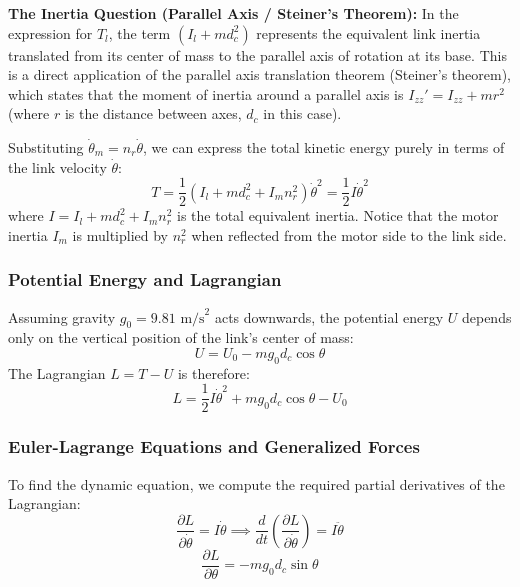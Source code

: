 \documentclass[11pt,a4paper]{article}
\begin{document}
\noindent \textbf{The Inertia Question (Parallel Axis / Steiner's Theorem):} 
In the expression for $T_l$, the term $(I_l + m d_c^2)$ represents the equivalent link inertia translated from its center of mass to the parallel axis of rotation at its base. This is a direct application of the parallel axis translation theorem (Steiner's theorem), which states that the moment of inertia around a parallel axis is $I_{zz}' = I_{zz} + m r^2$ (where $r$ is the distance between axes, $d_c$ in this case). 

Substituting $\dot{\theta}_m = n_r \dot{\theta}$, we can express the total kinetic energy purely in terms of the link velocity $\dot{\theta}$:
\begin{equation}
T = \frac{1}{2} (I_l + m d_c^2 + I_m n_r^2) \dot{\theta}^2 = \frac{1}{2} I \dot{\theta}^2
\end{equation}
where $I = I_l + m d_c^2 + I_m n_r^2$ is the total equivalent inertia. Notice that the motor inertia $I_m$ is multiplied by $n_r^2$ when reflected from the motor side to the link side.

\subsubsection*{Potential Energy and Lagrangian}
Assuming gravity $g_0 = 9.81 \text{ m/s}^2$ acts downwards, the potential energy $U$ depends only on the vertical position of the link's center of mass:
\begin{equation}
U = U_0 - m g_0 d_c \cos \theta
\end{equation}
The Lagrangian $L = T - U$ is therefore:
\begin{equation}
L = \frac{1}{2} I \dot{\theta}^2 + m g_0 d_c \cos \theta - U_0
\end{equation}

\subsubsection*{Euler-Lagrange Equations and Generalized Forces}

To find the dynamic equation, we compute the required partial derivatives of the Lagrangian:
\begin{equation}
\frac{\partial L}{\partial \dot{\theta}} = I \dot{\theta} \implies \frac{d}{dt} \left( \frac{\partial L}{\partial \dot{\theta}} \right) = I \ddot{\theta}
\end{equation}
\begin{equation}
\frac{\partial L}{\partial \theta} = - m g_0 d_c \sin \theta
\end{equation}
\end{document}
